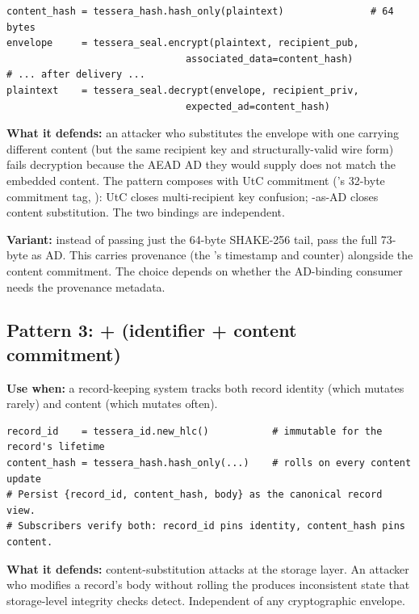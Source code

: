 \begin{lstlisting}[language=Pseudocode]
content_hash = tessera_hash.hash_only(plaintext)               # 64 bytes
envelope     = tessera_seal.encrypt(plaintext, recipient_pub,
                               associated_data=content_hash)
# ... after delivery ...
plaintext    = tessera_seal.decrypt(envelope, recipient_priv,
                               expected_ad=content_hash)
\end{lstlisting}

\textbf{What it defends:} an attacker who substitutes the envelope with one carrying different content (but the same recipient key and structurally-valid wire form) fails decryption because the AEAD AD they would supply does not match the embedded content. The pattern composes with UtC commitment (\tesseraseal{}'s 32-byte commitment tag, \citep{bellare2022commitment}): UtC closes multi-recipient key confusion; \tesserahash{}-as-AD closes content substitution. The two bindings are independent.

\textbf{Variant:} instead of passing just the 64-byte SHAKE-256 tail, pass the full 73-byte \tesserahash{} as AD. This carries provenance (the \tesserahash{}'s timestamp and counter) alongside the content commitment. The choice depends on whether the AD-binding consumer needs the provenance metadata.

\subsection{Pattern 3: \tesseraid{} + \tesserahash{} (identifier + content commitment)}

\textbf{Use when:} a record-keeping system tracks both record identity (which mutates rarely) and content (which mutates often).

\begin{lstlisting}[language=Pseudocode]
record_id    = tessera_id.new_hlc()           # immutable for the record's lifetime
content_hash = tessera_hash.hash_only(...)    # rolls on every content update
# Persist {record_id, content_hash, body} as the canonical record view.
# Subscribers verify both: record_id pins identity, content_hash pins content.
\end{lstlisting}

\textbf{What it defends:} content-substitution attacks at the storage layer. An attacker who modifies a record's body without rolling the \tesserahash{} produces inconsistent state that storage-level integrity checks detect. Independent of any cryptographic envelope.

